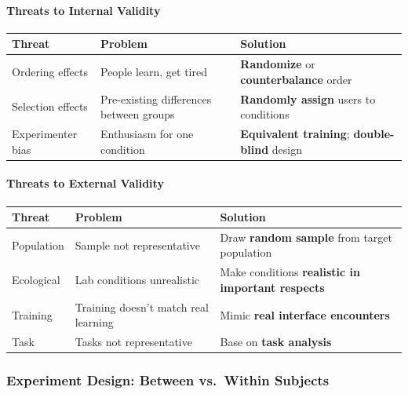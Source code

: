 \paragraph*{Threats to Internal Validity}

\begin{center}
\renewcommand{\arraystretch}{1.3}
\begin{tabular}{@{} l p{5cm} p{5cm} @{}}
\toprule
\textbf{Threat} & \textbf{Problem} & \textbf{Solution} \\
\midrule
Ordering effects & People learn, get tired & \textbf{Randomize} or \textbf{counterbalance} order \\
Selection effects & Pre-existing differences between groups & \textbf{Randomly assign} users to conditions \\
Experimenter bias & Enthusiasm for one condition & \textbf{Equivalent training}; \textbf{double-blind} design \\
\bottomrule
\end{tabular}
\end{center}

\paragraph*{Threats to External Validity}

\begin{center}
\renewcommand{\arraystretch}{1.3}
\begin{tabular}{@{} l p{5cm} p{5cm} @{}}
\toprule
\textbf{Threat} & \textbf{Problem} & \textbf{Solution} \\
\midrule
Population & Sample not representative & Draw \textbf{random sample} from target population \\
Ecological & Lab conditions unrealistic & Make conditions \textbf{realistic in important respects} \\
Training & Training doesn't match real learning & Mimic \textbf{real interface encounters} \\
Task & Tasks not representative & Base on \textbf{task analysis} \\
\bottomrule
\end{tabular}
\end{center}

\subsubsection*{Experiment Design: Between vs.\ Within Subjects}

